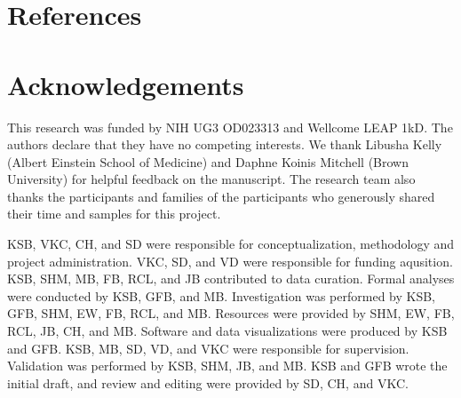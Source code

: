 \documentclass{article}
\begin{document}
\section*{References}

\printbibliography[heading=none]

\section*{Acknowledgements}

This research was funded by NIH UG3 OD023313 and Wellcome LEAP 1kD.
The authors declare that they have no competing interests.
We thank Libusha Kelly (Albert Einstein School of Medicine) and Daphne Koinis Mitchell (Brown University)
for helpful feedback on the manuscript. The research team also thanks the participants and families
of the participants who generously shared their time and samples for this project.


KSB, VKC, CH, and SD were responsible for conceptualization,
methodology and project administration.
VKC, SD, and VD were responsible for funding aqusition.
KSB, SHM, MB, FB, RCL, and JB contributed to data curation.
Formal analyses were conducted by KSB, GFB, and MB.
Investigation was performed by KSB, GFB, SHM, EW, FB, RCL, and MB.
Resources were provided by SHM, EW, FB, RCL, JB, CH, and MB.
Software and data visualizations were produced by KSB and GFB.
KSB, MB, SD, VD, and VKC were responsible for supervision.
Validation was performed by KSB, SHM, JB, and MB.
KSB and GFB wrote the initial draft, 
and review and editing were provided by SD, CH, and VKC.
\end{document}
